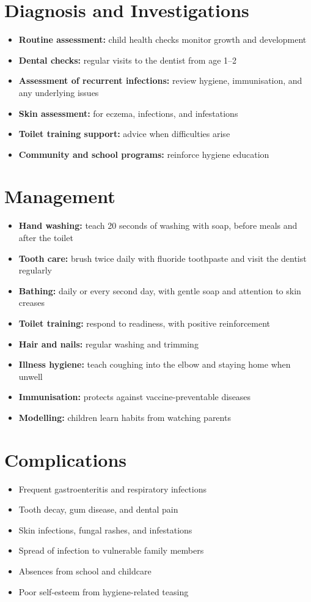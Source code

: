 \section*{Diagnosis and Investigations}
\begin{itemize}
    \item \textbf{Routine assessment:} child health checks monitor growth and development
    \item \textbf{Dental checks:} regular visits to the dentist from age 1--2
    \item \textbf{Assessment of recurrent infections:} review hygiene, immunisation, and any underlying issues
    \item \textbf{Skin assessment:} for eczema, infections, and infestations
    \item \textbf{Toilet training support:} advice when difficulties arise
    \item \textbf{Community and school programs:} reinforce hygiene education
\end{itemize}

\section*{Management}
\begin{itemize}
    \item \textbf{Hand washing:} teach 20 seconds of washing with soap, before meals and after the toilet
    \item \textbf{Tooth care:} brush twice daily with fluoride toothpaste and visit the dentist regularly
    \item \textbf{Bathing:} daily or every second day, with gentle soap and attention to skin creases
    \item \textbf{Toilet training:} respond to readiness, with positive reinforcement
    \item \textbf{Hair and nails:} regular washing and trimming
    \item \textbf{Illness hygiene:} teach coughing into the elbow and staying home when unwell
    \item \textbf{Immunisation:} protects against vaccine-preventable diseases
    \item \textbf{Modelling:} children learn habits from watching parents
\end{itemize}

\section*{Complications}
\begin{itemize}
    \item Frequent gastroenteritis and respiratory infections
    \item Tooth decay, gum disease, and dental pain
    \item Skin infections, fungal rashes, and infestations
    \item Spread of infection to vulnerable family members
    \item Absences from school and childcare
    \item Poor self-esteem from hygiene-related teasing
\end{itemize}

